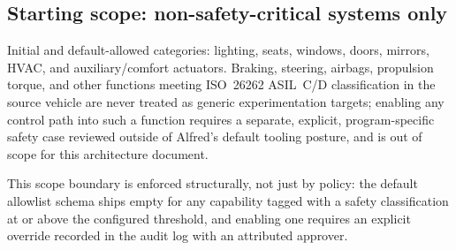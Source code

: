 \subsection{Starting scope: non-safety-critical systems only}

\begin{decision}[title={Scope boundary for Active Test Mode}]
Initial and default-allowed categories: lighting, seats, windows, doors, mirrors, HVAC, and auxiliary/comfort actuators. Braking, steering, airbags, propulsion torque, and other functions meeting ISO~26262 ASIL~C/D classification in the source vehicle are never treated as generic experimentation targets; enabling any control path into such a function requires a separate, explicit, program-specific safety case reviewed outside of Alfred's default tooling posture, and is out of scope for this architecture document.
\end{decision}

This scope boundary is enforced structurally, not just by policy: the default allowlist schema ships empty for any capability tagged with a safety classification at or above the configured threshold, and enabling one requires an explicit override recorded in the audit log with an attributed approver.
